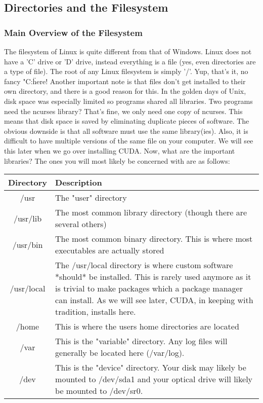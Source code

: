 	
\subsection{Directories and the Filesystem} \mdseries 
\subsubsection{Main Overview of the Filesystem} \mdseries 
The filesystem of Linux is quite different from that of Windows.  Linux does not have a 'C' drive or 'D' drive, instead everything is a file (yes, even directories are a type of file).  The root of any Linux filesystem is simply '/'.  Yup, that's it, no fancy "C:\" here!  Another important note is that files don't get installed to their own directory, and there is a good reason for this.  In the golden days of Unix, disk space was especially limited so programs shared all libraries.  Two programs need the ncurses library? That's fine, we only need one copy of ncurses.  This means that disk space is saved by eliminating duplicate pieces of software.  The obvious downside is that all software must use the same library(ies).  Also, it is difficult to have multiple versions of the same file on your computer.  We will see this later when we go over installing CUDA.  Now, what are the important libraries?  The ones you will most likely be concerned with are as follows:

\begin{tabularx}{\textwidth}{ | c | X | }
	\hline
	\textbf{Directory}	& \textbf{Description} \\
	\hline
	/usr		& The "user" directory \\
	/usr/lib	& The most common library directory (though there are several others) \\
	/usr/bin	& The most common binary directory.  This is where most executables are actually stored \\
	/usr/local	& The /usr/local directory is where custom software *should* be installed.  This is rarely used anymore as it is trivial to make packages which a package manager can install.  As we will see later, CUDA, in keeping with tradition, installs here. \\
	/home		& This is where the users home directories are located \\
	/var		& This is the "variable" directory.  Any log files will generally be located here (/var/log). \\
	/dev		& This is the "device" directory.  Your disk may likely be mounted to /dev/sda1 and your optical drive will likely be mounted to /dev/sr0. \\
	\hline
\end{tabularx}

